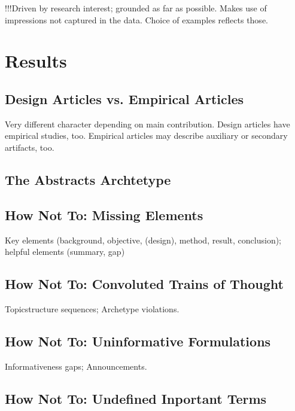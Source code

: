 \documentclass[10pt,journal,compsoc]{IEEEtran}
\begin{document}
!!!Driven by research interest; grounded as far as possible.
Makes use of impressions not captured in the data.
Choice of examples reflects those.


\section{Results}

\subsection{Design Articles vs. Empirical Articles}

\noindent
Very different character depending on main contribution.
Design articles have empirical studies, too.
Empirical articles may describe auxiliary or secondary artifacts, too.


\subsection{The Abstracts Archtetype}

\noindent



\subsection{How Not To: Missing Elements}

\noindent
Key elements (background, objective, (design), method, result, conclusion); helpful elements (summary, gap)


\subsection{How Not To: Convoluted Trains of Thought}

\noindent
Topicstructure sequences; Archetype violations.


\subsection{How Not To: Uninformative Formulations}

\noindent
Informativeness gaps; Announcements.


\subsection{How Not To: Undefined Inportant Terms}
\end{document}
